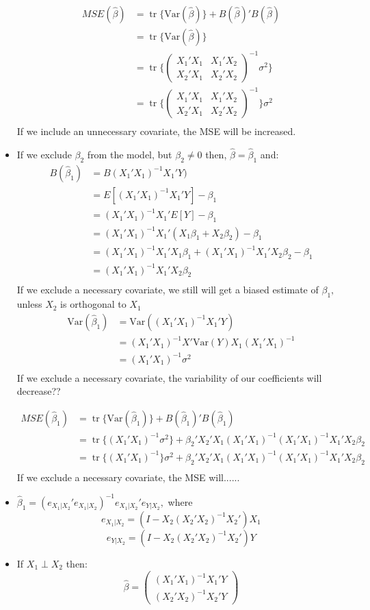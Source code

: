 \documentclass[12pt]{article}\usepackage{graphicx, color}
\theoremstyle{definition}
\newcommand{\Var}{\mathrm{Var}}
\renewcommand{\hat}{\widehat}
\DeclareMathOperator{\tr}{tr}
\begin{document}
\begin{itemize}
\begin{align*}MSE(\hat \beta)&=\tr\{\Var(\hat \beta)\}+B(\hat \beta)'B(\hat \beta)\\
&=\tr\{\Var(\hat \beta)\}\\
&=\tr\{\begin{pmatrix}X_1'X_1 & X_1'X_2 \\ X_2'X_1 & X_2'X_2\end{pmatrix}^{-1}\sigma^2\}\\
&=\tr\{\begin{pmatrix}X_1'X_1 & X_1'X_2 \\ X_2'X_1 & X_2'X_2\end{pmatrix}^{-1}\}\sigma^2\\
\end{align*}
If we include an unnecessary covariate, the MSE will be increased.

\item If we exclude $\beta_2$ from the model, but $\beta_2\neq0$ then, $\hat \beta =\hat \beta_1$ and:
\begin{align*}B(\hat \beta_1)&=B(X_1'X_1)^{-1}X_1'Y)\\
&=E[(X_1'X_1)^{-1}X_1'Y]-\beta_1\\
&=(X_1'X_1)^{-1}X_1'E[Y]-\beta_1\\
&=(X_1'X_1)^{-1}X_1'(X_1\beta_1+X_2\beta_2)-\beta_1\\
&=(X_1'X_1)^{-1}X_1'X_1\beta_1+(X_1'X_1)^{-1}X_1'X_2\beta_2-\beta_1\\
&=(X_1'X_1)^{-1}X_1'X_2\beta_2\\
\end{align*}
If we exclude a necessary covariate, we still will get a biased estimate of $\beta_1,$ unless $X_2$ is orthogonal to $X_1$
\begin{align*}\Var(\hat \beta_1)&=\Var((X_1'X_1)^{-1}X_1'Y)\\
&=(X_1'X_1)^{-1}X'\Var(Y)X_1(X_1'X_1)^{-1}\\
&=(X_1'X_1)^{-1}\sigma^2\\
\end{align*}
If we exclude a necessary covariate, the variability of our coefficients will decrease??

\begin{align*}MSE(\hat \beta_1)&=\tr\{\Var(\hat \beta_1)\}+B(\hat \beta_1)'B(\hat \beta_1)\\
&=\tr\{(X_1'X_1)^{-1}\sigma^2\}+\beta_2'X_2'X_1(X_1'X_1)^{-1}(X_1'X_1)^{-1}X_1'X_2\beta_2\\
&=\tr\{(X_1'X_1)^{-1}\}\sigma^2+\beta_2'X_2'X_1(X_1'X_1)^{-1}(X_1'X_1)^{-1}X_1'X_2\beta_2\\
\end{align*}
If we exclude a necessary covariate, the MSE will......
\item $\hat \beta_1 = (e_{X_1 | X_2}'e_{X_1 | X_2})^{-1}e_{X_1 | X_2}'e_{Y | X_2},$ 
where $$e_{X_1 | X_2}=(I-X_2(X_2'X_2)^{-1}X_2')X_1$$
$$e_{Y | X_2}=(I-X_2(X_2'X_2)^{-1}X_2')Y$$
\item If $X_1 \perp X_2$ then: $$\hat \beta = \begin{pmatrix}(X_1'X_1)^{-1}X_1'Y\\(X_2'X_2)^{-1}X_2'Y \end{pmatrix}$$
\end{itemize}
\end{document}

